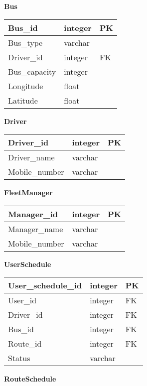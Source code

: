 \textbf{Bus}
\begin{table}[H]
	\centering
	\begin{tabular}{| m{4cm} | m{4cm} | m{4cm} |}
		\hline
		Bus\_id & integer & PK\\
		\hline
		Bus\_type & varchar & \\
		\hline
		Driver\_id & integer & FK\\
		\hline
		Bus\_capacity & integer & \\
		\hline
		Longitude & float & \\
		\hline
		Latitude & float & \\
		\hline
	\end{tabular}
\end{table}
\newpage
\textbf{Driver}
\begin{table}[H]
	\centering
	\begin{tabular}{| m{4cm} | m{4cm} | m{4cm} |}
		\hline
		Driver\_id & integer & PK\\
		\hline
		Driver\_name & varchar & \\
		\hline
		Mobile\_number & varchar & \\
		\hline
	\end{tabular}
\end{table}
\textbf{FleetManager}
\begin{table}[H]
	\centering
	\begin{tabular}{| m{4cm} | m{4cm} | m{4cm} |}
		\hline
		Manager\_id & integer & PK\\
		\hline
		Manager\_name & varchar & \\
		\hline
		Mobile\_number & varchar & \\
		\hline
	\end{tabular}
\end{table}
\textbf{UserSchedule}
\begin{table}[H]
	\centering
	\begin{tabular}{| m{4cm} | m{4cm} | m{4cm} |}
		\hline
		User\_schedule\_id & integer & PK \\
		\hline
		User\_id & integer & FK \\
		\hline
		Driver\_id & integer & FK\\
		\hline
		Bus\_id & integer & FK \\
		\hline
		Route\_id & integer & FK \\
		\hline
		Status & varchar & \\
		\hline
	\end{tabular}
\end{table}
\textbf{RouteSchedule}
